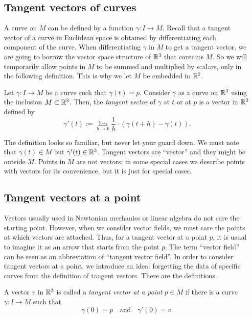 \documentclass{../exp}
\begin{document}
\subsection{Tangent vectors of curves}
A curve on $M$ can be defined by a function $\gamma:I\to M$.
Recall that a tangent vector of a curve in Euclidean space is obtained by differentiating each component of the curve.
When differentiating $\gamma$ in $M$ to get a tangent vector, we are going to borrow the vector space structure of $\mathbb{R}^3$ that contains $M$.
So we will temporarily allow points in $M$ to be summed and multiplied by scalars, only in the following definition.
This is why we let $M$ be embedded in $\mathbb{R}^3$.
\begin{defn}
Let $\gamma:I\to M$ be a curve such that $\gamma(t)=p$.
Consider $\gamma$ as a curve on $\mathbb{R}^3$ using the inclusion $M\subset\mathbb{R}^3$.
Then, the \emph{tangent vector} of $\gamma$ at $t$ or at $p$ is a vector in $\mathbb{R}^3$ defined by
\[\gamma'(t):=\lim_{h\to0}\frac1h\cdot(\gamma(t+h)-\gamma(t)).\]
\end{defn}
The definition looks so familiar, but never let your guard down.
We must note that $\gamma(t)\in M$ but $\gamma'(t)\in\mathbb{R}^3$.
Tangent vectors are ``vector'' and they might be outside $M$. 
Points in $M$ are not vectors; in some special cases we describe points with vectors for its convenience, but it is just for special cases.


\subsection{Tangent vectors at a point}

Vectors usually used in Newtonian mechanics or linear algebra do not care the starting point.
However, when we consider vector fields, we must care the points at which vectors are attached.
Thus, for a tangent vector at a point $p$, it is usual to imagine it as an arrow that starts from the point $p$.
The term ``vector field'' can be seen as an abbreviation of ``tangent vector field''.
In order to consider tangent vectors at a point, we introduce an idea: forgetting the data of specific curves from the definition of tangent vectors.
There are the definitions.

\begin{defn}
A vector $v$ in $\mathbb{R}^3$ is called a \emph{tangent vector at a point} $p\in M$ if there is a curve $\gamma:I\to M$ such that
\[\gamma(0)=p\quad\text{and}\quad\gamma'(0)=v.\]
\end{defn}
\end{document}
